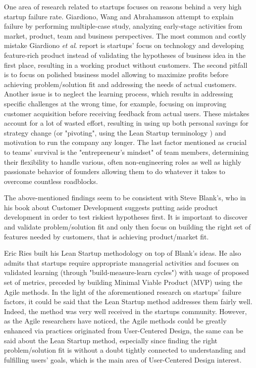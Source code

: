 \documentclass{article}
\begin{document}
One area of research related to startups focuses on reasons behind a very high startup failure rate. Giardiono, Wang and Abrahamsson \cite{giardino2014early} attempt to explain failure by performing multiple-case study, analyzing early-stage activities from market, product, team and business perspectives. The most common and costly mistake Giardiono \textit{et al}. report is startups' focus on technology and developing feature-rich product instead of validating the hypotheses of business idea in the first place, resulting in a working product without customers. The second pitfall is to focus on polished business model allowing to maximize profits before achieving problem/solution fit and addressing the needs of actual customers. Another issue is to neglect the learning process, which results in addressing specific challenges at the wrong time, for example, focusing on improving customer acquisition before receiving feedback from actual users. These mistakes account for a lot of wasted effort, resulting in using up both personal savings for strategy change (or "pivoting", using the Lean Startup terminology \cite{ries2011lean}) and motivation to run the company any longer. The last factor mentioned as crucial to teams' survival is the "entrepreneur's mindset" of team members, determining their flexibility to handle various, often non-engineering roles as well as highly passionate behavior of founders allowing them to do whatever it takes to overcome countless roadblocks.

The above-mentioned findings seem to be consistent with Steve Blank's, who in his book about Customer Development \cite{blank2013four} suggests putting aside product development in order to test riskiest hypotheses first. It is important to discover and validate problem/solution fit and only then focus on building the right set of features needed by customers, that is achieving product/market fit.

Eric Ries built his Lean Startup methodology \cite{ries2011lean} on top of Blank's ideas. He also admits that startups require appropriate managerial activities and focuses on validated learning (through "build-measure-learn cycles") with usage of proposed set of metrics, preceded by building Minimal Viable Product (MVP) using the Agile methods. In the light of the aforementioned research on startups' failure factors, it could be said that the Lean Startup method addresses them fairly well. Indeed, the method was very well received in the startups community. However, as the Agile researchers have noticed, the Agile methods could be greatly enhanced via practices originated from User-Centered Design, the same can be said about the Lean Startup method, especially since finding the right problem/solution fit is without a doubt tightly connected to understanding and fulfilling users' goals, which is the main area of User-Centered Design interest.
\end{document}
